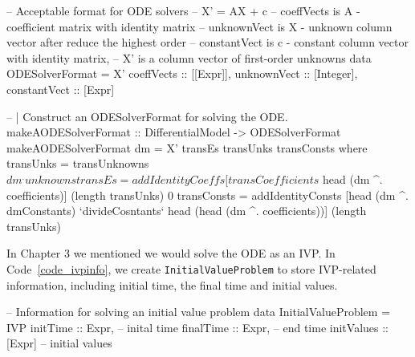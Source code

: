 \begin{listing}
\begin{haskell1}
-- Acceptable format for ODE solvers
-- X' = AX + c
-- coeffVects is A - coefficient matrix with identity matrix
-- unknownVect is X - unknown column vector after reduce the highest order
-- constantVect is c - constant column vector with identity matrix, 
-- X' is a column vector of first-order unknowns
data ODESolverFormat = X'{
  coeffVects :: [[Expr]],
  unknownVect :: [Integer],
  constantVect :: [Expr]
}

-- | Construct an ODESolverFormat for solving the ODE.
makeAODESolverFormat :: DifferentialModel -> ODESolverFormat
makeAODESolverFormat dm = X' transEs transUnks transConsts
  where transUnks = transUnknowns $ dm ^. unknowns
        transEs = addIdentityCoeffs [transCoefficients $ head (dm ^. coefficients)] (length transUnks) 0
        transConsts = addIdentityConsts [head (dm ^. dmConstants) `divideCosntants` head (head (dm ^. coefficients))] (length transUnks)
\end{haskell1}
\label{code_odesolverformat}
\end{listing}

In Chapter 3 we mentioned we would solve the ODE as an IVP. In Code~\ref{code_ivpinfo}, we create \verb|InitialValueProblem| to store IVP-related information, including initial time, the final time and initial values.
\begin{listing}
\begin{haskell1}
-- Information for solving an initial value problem
data InitialValueProblem = IVP{
  initTime :: Expr, -- inital time
  finalTime :: Expr, -- end time
  initValues :: [Expr] -- initial values
}
\end{haskell1}
\label{code_ivpinfo}
\end{listing}

